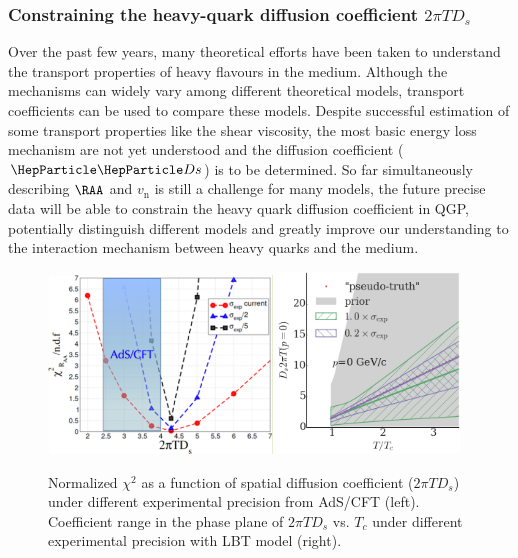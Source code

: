 \subsubsection{Constraining the heavy-quark diffusion coefficient $2\pi TD_s$}

Over the past few years, many theoretical efforts have been taken to understand the transport properties of heavy flavours in the medium. Although the mechanisms can widely vary among different theoretical models, transport coefficients can be used to compare these models. Despite successful estimation of some transport properties like the shear viscosity, the most basic energy loss mechanism are not yet understood and the diffusion coefficient ($\PDs$) is to be determined. So far simultaneously describing $\RAA$ and $v_{\mathrm{n}}$ is still a challenge for many models, the future precise data will be able to constrain the heavy quark diffusion coefficient in QGP, potentially distinguish different models and greatly improve our understanding to the interaction mechanism between heavy quarks and the medium.

\begin{figure}[ht]
  \begin{center}
    \includegraphics[width=0.53\textwidth]{hf/figures/Greco.pdf}
    \includegraphics[width=0.43\textwidth]{hf/figures/Plot_D2piT_posterior_p0.png}
    \caption{Normalized $\chi^{2}$ as a function of spatial diffusion coefficient ($2\pi TD_{s}$) under different experimental precision from AdS/CFT (left). Coefficient range in the phase plane of $2\pi TD_{s}$ vs. $T_{c}$ under different experimental precision with LBT model (right).}
    \label{fig:RAAv2.Dstheory}
  \end{center}
\end{figure}

